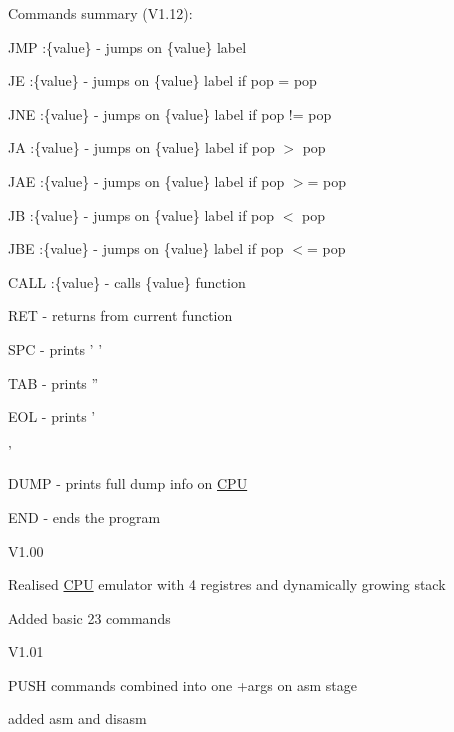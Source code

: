 \begin{DoxyParagraph}{Commands summary (V1.12)\-:}
\par
 J\-M\-P \-:\{value\} -\/ jumps on \{value\} label\par
 J\-E \-:\{value\} -\/ jumps on \{value\} label if pop = pop\par
 J\-N\-E \-:\{value\} -\/ jumps on \{value\} label if pop != pop\par
 J\-A \-:\{value\} -\/ jumps on \{value\} label if pop $>$ pop\par
 J\-A\-E \-:\{value\} -\/ jumps on \{value\} label if pop $>$= pop\par
 J\-B \-:\{value\} -\/ jumps on \{value\} label if pop $<$ pop\par
 J\-B\-E \-:\{value\} -\/ jumps on \{value\} label if pop $<$= pop\par
\par
 C\-A\-L\-L \-:\{value\} -\/ calls \{value\} function\par
 R\-E\-T -\/ returns from current function\par
\par
 S\-P\-C -\/ prints ' '\par
 T\-A\-B -\/ prints ''\par
 E\-O\-L -\/ prints '\par
'\par
\par
 D\-U\-M\-P -\/ prints full dump info on \hyperlink{structCPU}{C\-P\-U}\par
\par
 E\-N\-D -\/ ends the program\par
 
\end{DoxyParagraph}
\begin{DoxyParagraph}{V1.00}

\begin{DoxyItemize}
\item Realised \hyperlink{structCPU}{C\-P\-U} emulator with 4 registres and dynamically growing stack
\item Added basic 23 commands
\end{DoxyItemize}
\end{DoxyParagraph}
\begin{DoxyParagraph}{V1.01}

\begin{DoxyItemize}
\item P\-U\-S\-H commands combined into one +args on asm stage
\item added asm and disasm
\end{DoxyItemize}
\end{DoxyParagraph}
